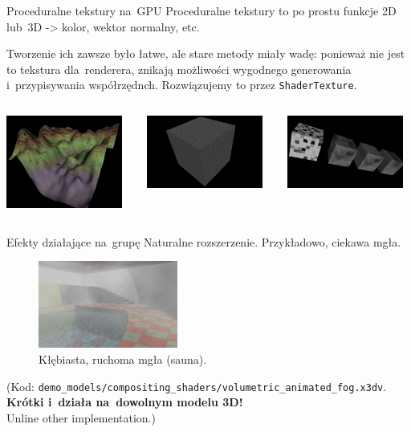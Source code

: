 \documentclass{beamer}
\begin{document}
\begin{frame}{Proceduralne tekstury na~GPU}
Proceduralne tekstury to po prostu funkcje 2D lub~3D ->
kolor, wektor normalny, etc.

Tworzenie ich zawsze było łatwe, ale stare metody miały wadę:
ponieważ nie jest to tekstura dla~renderera, znikają możliwości wygodnego
generowania i~przypisywania współrzędnch. Rozwiązujemy to przez
\texttt{ShaderTexture}.

\begin{columns}[T]
  \begin{column}{1in}
    \includegraphics[width=1.5in]{../terrain}
  \end{column}
  \begin{column}{1in}
    \includegraphics[width=1.5in]{../shader_texture_edge_detection}
  \end{column}
  \begin{column}{1in}
    \includegraphics[width=1.5in]{../noise}
  \end{column}
\end{columns}

\end{frame}

\begin{frame}{Efekty działające na~grupę}
Naturalne rozszerzenie. Przykładowo, ciekawa mgła.

\begin{figure}
  \centering
  \includegraphics[width=1.8in]{../volumetric_animated_fog_all}
  \caption{Kłębiasta, ruchoma mgła (sauna).}
\end{figure}

(Kod: \texttt{demo\_models/compositing\_shaders/volumetric\_animated\_fog.x3dv}.\\
\textbf{Krótki i~działa na~dowolnym modelu 3D!}\\
Unline other implementation.)

\end{frame}
\end{document}
